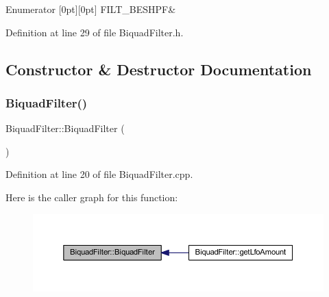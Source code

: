 \begin{DoxyEnumFields}{Enumerator}
[0pt][0pt]{}\mbox{\label{class_biquad_filter_a173337ea2d17607e19495cf7b91f1110ada971aea56389a82cad5bcdc742cb887}} 
F\+I\+L\+T\+\_\+\+B\+E\+S\+H\+PF&\\
\hline

\end{DoxyEnumFields}


Definition at line 29 of file Biquad\+Filter.\+h.



\subsection{Constructor \& Destructor Documentation}
\mbox{\label{class_biquad_filter_a58057f61de80a0103d49a075db1843d7}} 
\subsubsection{\texorpdfstring{Biquad\+Filter()}{BiquadFilter()}}
{\footnotesize\ttfamily Biquad\+Filter\+::\+Biquad\+Filter (\begin{DoxyParamCaption}{ }\end{DoxyParamCaption})}



Definition at line 20 of file Biquad\+Filter.\+cpp.

Here is the caller graph for this function\+:
\nopagebreak
\begin{figure}[H]
\begin{center}
\leavevmode
\includegraphics[width=350pt]{class_biquad_filter_a58057f61de80a0103d49a075db1843d7_icgraph}
\end{center}
\end{figure}
\mbox{\label{class_biquad_filter_aafdd776f1b96fd9c01c5ea8adbfae35a}} 
